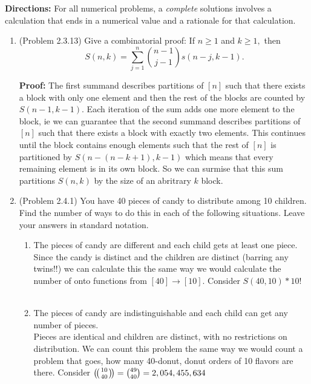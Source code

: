 \documentclass{amsart}
\newcommand{\textmultiset}[2]{\bigl(\!{\binom{#1}{#2}}\!\bigr)}
\newcommand{\displaymultiset}[2]{\left(\!{\binom{#1}{#2}}\!\right)}
\newcommand\multiset[2]{\mathchoice{\displaymultiset{#1}{#2}}
                                {\textmultiset{#1}{#2}}
                                {\textmultiset{#1}{#2}}
                                {\textmultiset{#1}{#2}}}
\def\multiset#1#2{\left(\!\left({#1\atopwithdelims..#2}\right)\!\right)}
\begin{document}
\thispagestyle{fancy}

\textbf{Directions:} For all numerical problems, a \emph{complete} solutions involves a calculation that ends in a numerical value and a rationale for that calculation.\\


\begin{enumerate}
\item (Problem 2.3.13) Give a combinatorial proof: If $n \geq 1$ and $k\geq 1,$ then $$S(n,k)=\sum_{j=1}^n {n-1 \choose j-1} s(n-j,k-1).$$

\noindent\textbf{Proof:} The first summand describes partitions of $[n]$ such that there exists a block with only one element and then the rest of the blocks are counted by $S(n-1,k-1)$. Each iteration of the sum adds one more element to the block, ie we can guarantee that the second summand describes partitions of $[n]$ such that there exists a block with exactly two elements. This continues until the block contains enough elements such that the rest of $[n]$ is partitioned by $S(n-(n-k+1),k-1)$ which means that every remaining element is in its own block. So we can surmise that this sum partitions $S(n,k)$ by the size of an abritrary $k$ block.\\

\vspace{.5in}

\item (Problem 2.4.1) You have 40 pieces of candy to distribute among 10 children. Find the number of ways to do this in each of the following situations. Leave your answers in standard notation.\\
\begin{enumerate}
	\item The pieces of candy are different and each child gets at least one piece.\\
	Since the candy is distinct and the children are distinct (barring any twins!!) we can calculate this the same way we would calculate the number of onto functions from $[40]\to [10]$. Consider $S(40,10)*10!$\\\\
	
	
	
	
	
	\item The pieces of candy are indistinguishable and each child can get any number of pieces.\\
	Pieces are identical and children are distinct, with no restrictions on distribution. We can count this problem the same way we would count a problem that goes, how many 40-donut, donut orders of 10 flavors are there. Consider $\multiset{10}{40} = {49\choose40} = 2,054,455,634$\\\\
	

\end{enumerate}
\end{enumerate}
\end{document}
